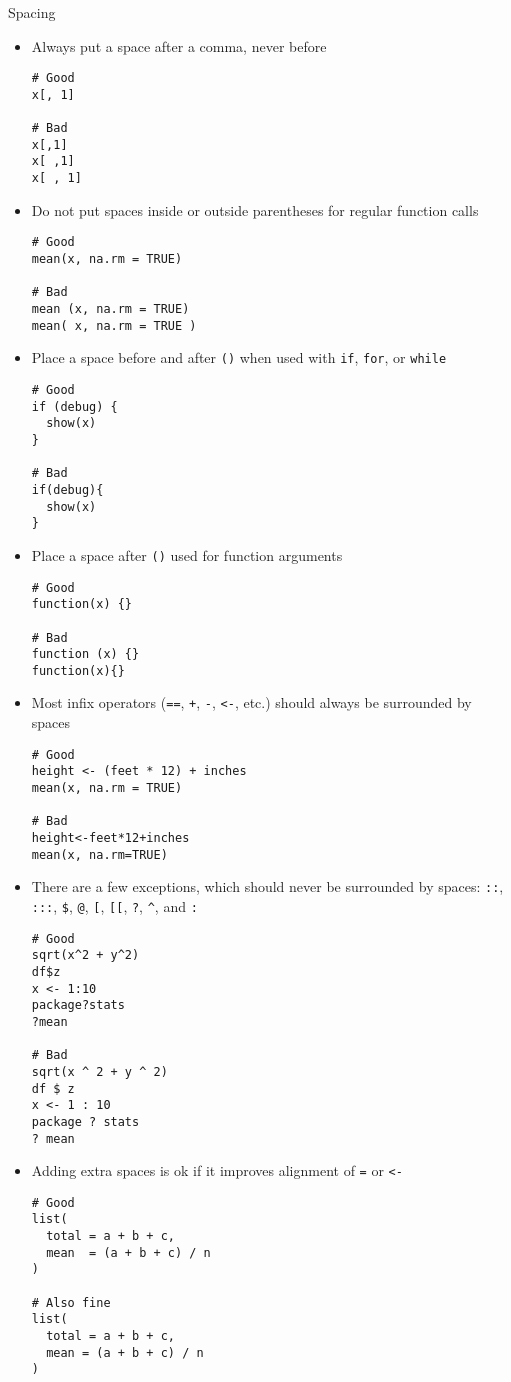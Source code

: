 \documentclass[aspectratio=169]{beamer}
\begin{document}
\begin{frame}{Spacing}
  \begin{itemize}
    \item Always put a space after a comma, never before
  \begin{lstlisting}
# Good
x[, 1]

# Bad
x[,1]
x[ ,1]
x[ , 1]
  \end{lstlisting}
  \framebreak

  \item Do not put spaces inside or outside parentheses for regular function
    calls
  \begin{lstlisting}
# Good
mean(x, na.rm = TRUE)

# Bad
mean (x, na.rm = TRUE)
mean( x, na.rm = TRUE )
  \end{lstlisting}
  \framebreak

\item Place a space before and after \texttt{()} when used with \texttt{if},
  \texttt{for}, or \texttt{while}
  \begin{lstlisting}
# Good
if (debug) {
  show(x)
}

# Bad
if(debug){
  show(x)
}
  \end{lstlisting}
  \framebreak

\item Place a space after \texttt{()} used for function arguments
  \begin{lstlisting}
# Good
function(x) {}

# Bad
function (x) {}
function(x){}
  \end{lstlisting}
  \framebreak

    \item Most infix operators (\verb+==+, \verb|+|, \verb+-+, \verb+<-+, etc.)
      should always be surrounded by spaces
  \begin{lstlisting}
# Good
height <- (feet * 12) + inches
mean(x, na.rm = TRUE)

# Bad
height<-feet*12+inches
mean(x, na.rm=TRUE)
  \end{lstlisting}
  \framebreak

    \item There are a few exceptions, which should never be surrounded by
      spaces: \verb+::+, \verb+:::+, \verb+$+, \verb+@+, \verb+[+, \verb+[[+,
      \verb+?+, \verb+^+, and \verb+:+
      {\small
  \begin{lstlisting}
# Good
sqrt(x^2 + y^2)
df$z
x <- 1:10
package?stats
?mean

# Bad
sqrt(x ^ 2 + y ^ 2)
df $ z
x <- 1 : 10
package ? stats
? mean
  \end{lstlisting}
  }
    \item Adding extra spaces is ok if it improves alignment of \verb+=+ or
      \verb+<-+
  \begin{lstlisting}
# Good
list(
  total = a + b + c,
  mean  = (a + b + c) / n
)

# Also fine
list(
  total = a + b + c,
  mean = (a + b + c) / n
)
  \end{lstlisting}
  \end{itemize}
\end{frame}
\end{document}
